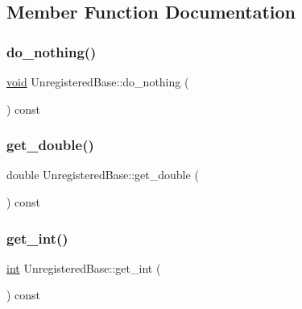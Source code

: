 \subsection{Member Function Documentation}
\mbox{\label{class_unregistered_base_a14d1855ccb40e24e8743cb17fed8a613}} 
\subsubsection{\texorpdfstring{do\_nothing()}{do\_nothing()}}
{\footnotesize\ttfamily \mbox{\hyperlink{_s_d_l__opengles2__gl2ext_8h_ae5d8fa23ad07c48bb609509eae494c95}{void}} Unregistered\+Base\+::do\+\_\+nothing (\begin{DoxyParamCaption}{ }\end{DoxyParamCaption}) const\hspace{0.3cm}{\ttfamily [inline]}}

\mbox{\label{class_unregistered_base_a034550079254a6b31b250868d42eb993}} 
\subsubsection{\texorpdfstring{get\_double()}{get\_double()}}
{\footnotesize\ttfamily double Unregistered\+Base\+::get\+\_\+double (\begin{DoxyParamCaption}{ }\end{DoxyParamCaption}) const\hspace{0.3cm}{\ttfamily [inline]}}

\mbox{\label{class_unregistered_base_a7491bae5acdebd21c68bb94dbce13382}} 
\subsubsection{\texorpdfstring{get\_int()}{get\_int()}}
{\footnotesize\ttfamily \mbox{\hyperlink{warnings_8h_a74f207b5aa4ba51c3a2ad59b219a423b}{int}} Unregistered\+Base\+::get\+\_\+int (\begin{DoxyParamCaption}{ }\end{DoxyParamCaption}) const\hspace{0.3cm}{\ttfamily [inline]}}

